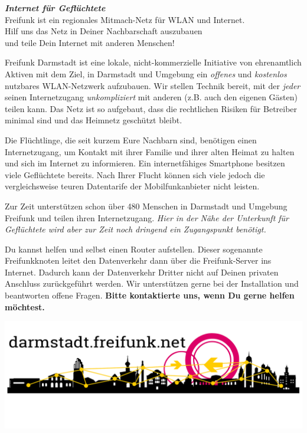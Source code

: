 \documentclass[a4paper]{article}
\begin{document}
\thispagestyle{empty}

\begin{center}
\Huge \textit{\textbf{\textcolor{freifunkpink}{Internet für Geflüchtete}}} \\
\vspace{0.6cm}
\large Freifunk ist ein regionales Mitmach-Netz für WLAN und Internet.\\
Hilf uns das Netz in Deiner Nachbarschaft auszubauen \\
und teile Dein Internet mit anderen Menschen!
\normalsize

\vspace{1.0cm}
\end{center}

{ }
\vspace{0.5cm}

Freifunk Darmstadt ist eine lokale, nicht-kommerzielle Initiative von ehrenamtlich Aktiven mit dem Ziel, in Darmstadt und Umgebung ein \emph{offenes} und \emph{kostenlos} nutzbares WLAN-Netzwerk aufzubauen. Wir stellen Technik bereit, mit der \emph{jeder} seinen Internetzugang \emph{unkompliziert} mit anderen (z.B. auch den eigenen Gästen) teilen kann. Das Netz ist so aufgebaut, dass die rechtlichen Risiken für Betreiber minimal sind und das Heimnetz geschützt bleibt.

Die Flüchtlinge, die seit kurzem Eure Nachbarn sind, benötigen einen Internetzugang, um Kontakt mit ihrer Familie und ihrer alten Heimat zu halten und sich im Internet zu informieren. Ein internetfähiges Smartphone besitzen viele Geflüchtete bereits. Nach Ihrer Flucht können sich viele jedoch die vergleichsweise teuren Datentarife der Mobilfunkanbieter nicht leisten.

Zur Zeit unterstützen schon über 480 Menschen in Darmstadt und Umgebung Freifunk und teilen ihren Internetzugang. \emph{Hier in der Nähe der Unterkunft für Geflüchtete wird aber zur Zeit noch dringend ein Zugangspunkt benötigt.}

Du kannst helfen und selbst einen Router aufstellen. Dieser sogenannte Freifunkknoten leitet den Datenverkehr dann über die Freifunk-Server ins Internet. Dadurch kann der Datenverkehr Dritter nicht auf Deinen privaten Anschluss zurückgeführt werden. Wir unterstützen gerne bei der Installation und beantworten offene Fragen. \textbf{Bitte kontaktierte uns, wenn Du gerne helfen möchtest.}

\vspace{0.67cm}
\hspace{-0.24cm}
\includegraphics[width=0.965\paperwidth]{../images/ffda-footer-dark}
\end{document}
